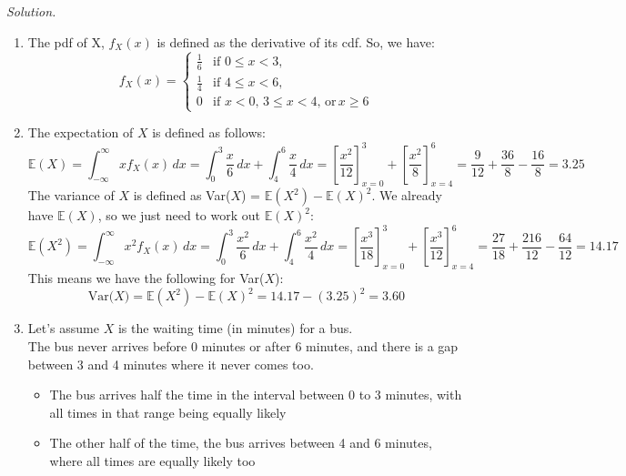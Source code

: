 \documentclass[11pt]{article}
\newenvironment{solution}{%
  \noindent\textit{Solution.}\quad
}{\par\bigskip}
\begin{document}
\begin{solution}
\begin{enumerate}
      \item The pdf of X, $f_X(x)$ is defined as the derivative of its cdf. So, we have:
            \[
            f_{X}(x) = 
            \begin{cases}
            \frac{1}{6}  & \text{if } 0 \le x < 3, \\
            \frac{1}{4} & \text{if } 4 \le x < 6, \\
            0 & \text{if } x<0, \, 3 \le x < 4, \, \text{or} \, x \ge 6
            \end{cases}
            \]
      \item The expectation of $X$ is defined as follows:
            \[
            \mathbb{E}(X) = \int_{-\infty}^{\infty}xf_X(x)\,dx
            = \int_{0}^{3} \frac{x}{6}\,dx + \int_{4}^{6} \frac{x}{4}\,dx
            = \left[\frac{x^2}{12}\right]_{x=0}^{3} + 
                  \left[\frac{x^2}{8}\right]_{x=4}^{6}
            = \frac{9}{12} + \frac{36}{8} - \frac{16}{8} = 3.25
            \]
            The variance of $X$ is defined as Var($X$) = $\mathbb{E}(X^2) - 
            \mathbb{E}(X)^2$. We already have $\mathbb{E}(X)$, so we just need 
            to work out $\mathbb{E}(X)^2$:
            \[
            \mathbb{E}(X^2) = \int_{-\infty}^{\infty}{x^2}f_X(x)\,dx
            = \int_{0}^{3} \frac{x^2}{6}\,dx + \int_{4}^{6} \frac{x^2}{4}\,dx
            = \left[\frac{x^3}{18}\right]_{x=0}^{3} + 
                  \left[\frac{x^3}{12}\right]_{x=4}^{6}
            = \frac{27}{18} + \frac{216}{12} - \frac{64}{12} = 14.17
            \]
            This means we have the following for Var($X$):
            \[
            \text{Var($X$)} = \mathbb{E}(X^2) - \mathbb{E}(X)^2
            = 14.17 - (3.25)^2 = 3.60
            \]
      \item Let's assume $X$ is the waiting time (in minutes) for a bus. \\
            The bus never arrives before 0 minutes or after 6 minutes, and there 
            is a gap between 3 and 4 minutes where it never comes too.
            \begin{itemize}
            \item The bus arrives half the time in the interval between 0 to 3 minutes, 
                  with all times in that range being equally likely
            \item The other half of the time, the bus arrives between 4 and 6 minutes,
                  where all times are equally likely too
            \end{itemize}
\end{enumerate}
\end{solution}
\end{document}
